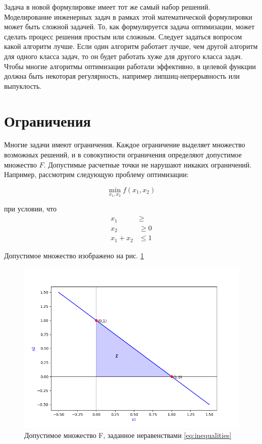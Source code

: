 Задача в новой формулировке имеет тот же самый набор решений. Моделирование инженерных задач в рамках этой математической формулировки может быть сложной задачей. То, как формулируется задача оптимизации, может сделать процесс решения простым или сложным. Следует задаться вопросом какой алгоритм лучше. Если один алгоритм работает лучше, чем другой алгоритм для одного класса задач, то он будет работать хуже для другого класса задач. Чтобы многие алгоритмы оптимизации работали эффективно, в целевой функции должна быть некоторая регулярность, например липшиц-непрерывность или выпуклость. 

\section{Ограничения}

Многие задачи имеют ограничения. Каждое ограничение выделяет множество возможных решений, и в совокупности ограничения определяют допустимое множество  $F$. Допустимые расчетные точки не нарушают никаких ограничений. \cite{kochenderfer2020optimization} Например, рассмотрим следующую проблему оптимизации:

\begin{equation}
\min_{x_1, x_2} f(x_1, x_2)
\label{eq:taskOptimizationX1X2}
\end{equation}


 \begin{center}
 при условии, что 
\begin{equation}
  \begin{aligned}
    x_1 &\geq  \\
    x_2 &\geq 0  \\
    x_1 + x_2 &\leq 1
  \end{aligned}
  \label{eq:inequalities}
\end{equation}
\end{center}

Допустимое множество изображено на рис. \ref{fig:figure_2}

\begin{figure}[ht]
 \centering
		\includegraphics[height = 7 cm, keepaspectratio]{../assets/images/Figure_2.png}
		\caption{Допустимое множество F, заданное неравенствами \eqref{eq:inequalities}}
		\label{fig:figure_2}
	\end{figure}
    
